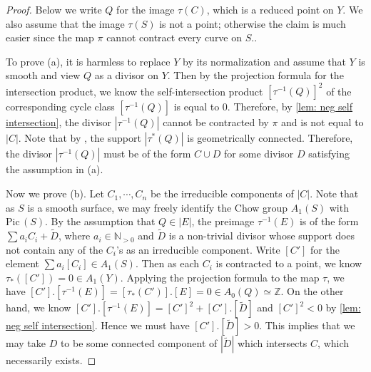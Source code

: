 \documentclass[11pt, letterpaper]{amsart}
\theoremstyle{plain}
\theoremstyle{definition}
\newcommand{\IN}{\mathbb{N}}
\newcommand{\IZ}{\mathbb{Z}}
\newcommand{\<}{\langle}
\renewcommand{\>}{\rangle}
\def\wt{\widetilde}
\newcommand{\Pic}{\mathrm{Pic}\,}
\begin{document}
\begin{proof}
Below we write $Q$ for the image $\tau(C)$, which is a reduced point on $Y$. 
We also assume that the image $\tau(S)$ is not a point; otherwise the claim is much easier since the map $\pi$ cannot contract every curve on $S$..

To prove (a), it is harmless to replace $Y$ by its normalization and assume that $Y$ is smooth and view $Q$ as a divisor on $Y$. Then by the projection formula for the intersection product, we know the self-intersection product $[\tau^{-1}(Q)]^2$ of the corresponding cycle class $[\tau^{-1}(Q)]$ is equal to $0$. 
Therefore, by \cref{lem: neg self intersection}, the divisor $|\tau^{-1}(Q)|$ cannot be contracted by $\pi$ and is not equal to $|C|$.
Note that by \cite[\href{https://stacks.math.columbia.edu/tag/0AY8}{Tag 0AY8}]{stacks-project}, the support $|\tau^*(Q)|$ is geometrically connected. 
Therefore, the divisor $|\tau^{-1}(Q)|$ must be of the form $C \cup D$ for some divisor $D$ satisfying the assumption in (a). 

Now we prove (b). 
Let $C_1, \cdots, C_n$ be the irreducible components of $|C|$. 
Note that as $S$ is a smooth surface, we may freely identify the Chow group $A_1(S)$ with $\Pic(S)$. 
By the assumption that $Q \in |E|$, the preimage $\tau^{-1}(E)$ is of the form $\sum a_i C_i + \wt{D}$, where $a_i \in \IN_{> 0}$ and $\wt{D}$ is a non-trivial divisor whose support does not contain any of the $C_i$'s as an irreducible component. 
Write $[C']$ for the element $\sum a_i [C_i] \in A_1(S)$. 
Then as each $C_i$ is contracted to a point, we know $\tau_*([C'])= 0 \in A_1(Y)$. 
Applying the projection formula to the map $\tau$, we have $[C'] . [\tau^{-1}(E)] = [\tau_*(C')] . [E] =  0 \in A_0(Q) \simeq \IZ$. 
On the other hand, we know $[C'] . [\tau^{-1}(E)] = [C']^2 + [C' ]. [\wt{D}]$ and $[C']^2 < 0$ by \cref{lem: neg self intersection}. 
Hence we must have $[C'] . [\wt{D}] > 0$. 
This implies that we may take $D$ to be some connected component of $|\wt{D}|$ which intersects $C$, which necessarily exists. 
\end{proof}
\end{document}
